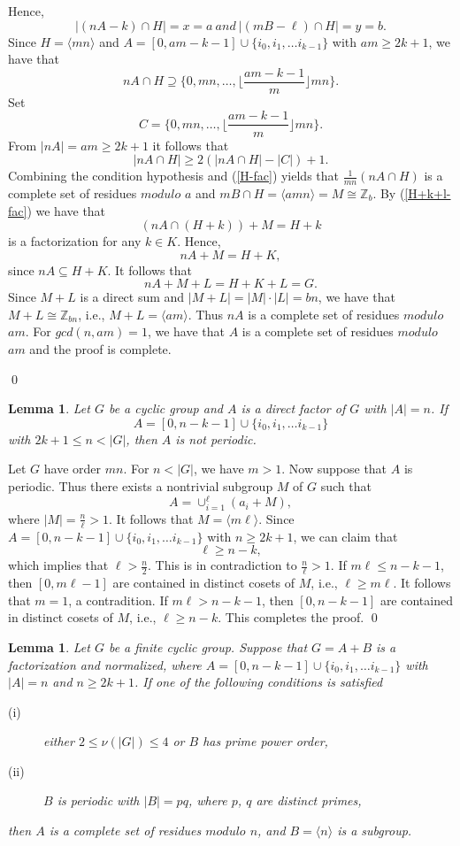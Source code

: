 \documentclass[preprint]{elsarticle}
\newtheorem{lem}[thm]{Lemma}
\begin{document}
Hence, $$|(nA-k)\cap H|=x=a \ and \ |(mB-\ell)\cap H|=y=b.$$
Since $H=\langle mn\rangle$ and $A=[0,am-k-1]\cup\{i_0,i_1,\ldots i_{k-1}\}$ with $am\geq 2k+1$,
we have that $$nA\cap H\supseteq \{0, mn, \ldots, \lfloor\frac{am-k-1}{m}\rfloor mn\}.$$
Set $$C=\{0, mn, \ldots, \lfloor\frac{am-k-1}{m}\rfloor mn\}.$$
From $|nA|=am\geq 2k+1$ it follows that
$$|nA\cap H|\geq 2(|nA\cap H|-|C|)+1.$$
Combining the condition hypothesis and (\ref{H-fac}) yields that
$\frac{1}{mn}(nA\cap H)$ is a complete set of residues $modulo$ $a$ and $mB\cap H=\langle amn\rangle=M\cong \mathbb{Z}_b$.
By (\ref{H+k+l-fac}) we have that $$(nA\cap (H + k))+M= H + k$$ is a factorization for any $k\in K$.
Hence, $$nA+M= H + K,$$ since $nA\subseteq H+K$.
It follows that $$nA+M+L= H + K+L=G.$$
Since $M+L$ is a direct sum and $|M+L|=|M|\cdot|L|=bn$,
we have that $M+L\cong \mathbb{Z}_{bn}$, i.e., $M+L=\langle am\rangle$.
Thus $nA$ is a complete set of residues $modulo$ $am$.
For $gcd(n,am)=1$, we have that $A$ is a complete set of residues $modulo$ $am$ and the proof is complete.

\qed

\begin{lem} \label{A-periodic}
Let $G$ be a cyclic group and $A$ is a direct factor of $G$ with $|A|=n$.
If $$A=[0,n-k-1]\cup\{i_0,i_1,\ldots i_{k-1}\}$$ with $2k+1\leq n<|G|$,
then $A$ is not periodic.
\end{lem}

\pf
Let $G$ have order $mn$.
For $n<|G|$, we have $m>1$.
Now suppose that $A$ is periodic.
Thus there exists a nontrivial subgroup $M$ of $G$ such that $$A=\cup_{i=1}^{\ell}(a_i+M),$$
where $|M|=\frac{n}{\ell}>1$.
It follows that $M=\langle m\ell\rangle.$
Since $A=[0,n-k-1]\cup\{i_0,i_1,\ldots i_{k-1}\}$ with $n\geq 2k+1$,
we can claim that $$\ell\geq n-k,$$
which implies that $\ell> \frac{n}{2}$.
This is in contradiction to $\frac{n}{\ell}>1$.
If $m\ell\leq n-k-1$, then $[0,m\ell-1]$ are contained in distinct cosets of $M$, i.e.,
$\ell\geq m\ell$.
It follows that $m=1$, a contradition.
If $m\ell> n-k-1$, then $[0,n-k-1]$ are contained in distinct cosets of $M$,
i.e., $\ell\geq n-k$.
This completes the proof.
\qed

\begin{lem} \label{B-subgroup}
Let $G$ be a finite cyclic group.
Suppose that $G = A+B$ is a factorization and normalized, where $A=[0,n-k-1]\cup\{i_0,i_1,\ldots i_{k-1}\}$
with $|A|=n$ and $n\geq 2k+1$.
If one of the following conditions is satisfied
\begin{description}
  \item[(i)] either $2\leq \nu(|G|)\leq 4$ or $B$ has prime power order,
  \item[(ii)] $B$ is periodic with $|B|=pq$, where $p$, $q$ are distinct primes,
\end{description}
then $A$ is a complete set of residues $modulo$ $n$,
and $B=\langle n\rangle$ is a subgroup.
\end{lem}
\end{document}
